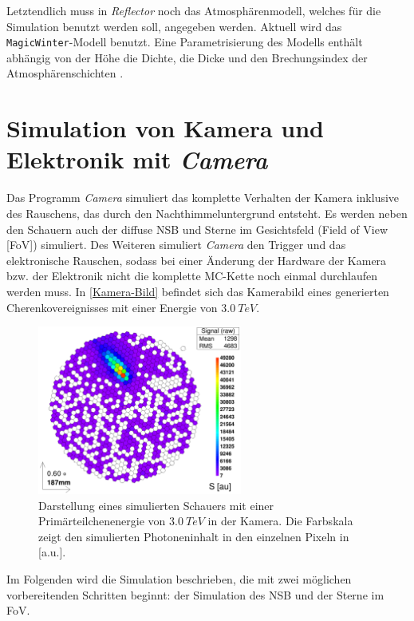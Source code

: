 Letztendlich muss in \textit{Reflector} noch das Atmosphärenmodell, welches für die Simulation benutzt werden soll, angegeben werden. 
Aktuell wird das \texttt{MagicWinter}-Modell benutzt. 
Eine Parametrisierung des Modells enthält abhängig von der Höhe die Dichte, die Dicke und den Brechungsindex der Atmosphärenschichten \cite{Haffke}.


\section{Simulation von Kamera und Elektronik mit \textit{Camera}}
\label{sec:Camera}
Das Programm \textit{Camera}\cite{Camera} simuliert das komplette Verhalten der Kamera inklusive des Rauschens, das durch den Nachthimmeluntergrund entsteht.
Es werden neben den Schauern auch der diffuse NSB und Sterne im Gesichtsfeld (Field of View [FoV]) simuliert. 
Des Weiteren simuliert \textit{Camera} den Trigger und das elektronische Rauschen, sodass bei einer Änderung der Hardware der Kamera bzw. der Elektronik nicht die komplette MC-Kette noch einmal durchlaufen werden muss.
In \autoref{Kamera-Bild} befindet sich das Kamerabild eines generierten Cherenkovereignisses mit einer Energie von $\SI{3.0}{TeV}$.

\begin{figure}
    \centering
    \includegraphics[width=0.6\textwidth]{./Plots/03_MonteCarlos/Signal_Job481_RunNr1513276_511_e3.0TeV_Zd32.2_fertig.png}
    \caption{Darstellung eines simulierten Schauers mit einer Primärteilchenenergie von $\SI{3.0}{TeV}$ in der Kamera. 
    Die Farbskala zeigt den simulierten Photoneninhalt in den einzelnen Pixeln in [a.u.].}
    \label{Kamera-Bild}
\end{figure}

Im Folgenden wird die Simulation beschrieben, die mit zwei möglichen vorbereitenden Schritten beginnt: der Simulation des NSB und der Sterne im FoV.

